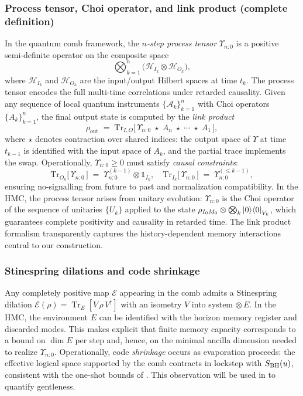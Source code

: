 \documentclass[a4paper,11pt]{article}
\newcommand{\HMC}{\textup{\textsc{HMC}}\xspace}
\theoremstyle{plain}
\theoremstyle{definition}
\theoremstyle{remark}
\begin{document}
\subsubsection{Process tensor, Choi operator, and link product (complete definition)}
\label{sssec:choi-link}
In the quantum comb framework, the \emph{$n$-step process tensor} $\Upsilon_{n{:}0}$ is a positive semi-definite operator on the composite space
\[
\bigotimes_{k=1}^n \bigl(\mathcal{H}_{I_k}\otimes\mathcal{H}_{O_k}\bigr),
\]
where $\mathcal{H}_{I_k}$ and $\mathcal{H}_{O_k}$ are the input/output Hilbert spaces at time $t_k$. The process tensor encodes the full multi-time correlations under retarded causality. Given any sequence of local quantum instruments $\{\mathcal{A}_k\}_{k=1}^n$ with Choi operators $\{A_k\}_{k=1}^n$, the final output state is computed by the \emph{link product}
\begin{equation}\label{eq:link-product}
\rho_{\mathrm{out}} \;=\; \mathrm{Tr}_{I,O}\!\Big[\,\Upsilon_{n{:}0} \;\star\; A_n \;\star\; \cdots \;\star\; A_1\,\Big],
\end{equation}
where $\star$ denotes contraction over shared indices: the output space of $\Upsilon$ at time $t_{k-1}$ is identified with the input space of $A_k$, and the partial trace implements the swap. Operationally, $\Upsilon_{n{:}0}\ge 0$ must satisfy \emph{causal constraints}:
\begin{equation}
\mathrm{Tr}_{O_k}\!\bigl[\,\Upsilon_{n{:}0}\,\bigr] \;=\; \Upsilon_{n{:}0}^{(k-1)}\otimes \mathbb{1}_{I_k},
\quad \mathrm{Tr}_{I_k}\!\bigl[\,\Upsilon_{n{:}0}\,\bigr] \;=\; \Upsilon_{n{:}0}^{(\le k-1)},
\end{equation}
ensuring no-signalling from future to past and normalization compatibility. In the \HMC{}, the process tensor arises from unitary evolution: $\Upsilon_{n{:}0}$ is the Choi operator of the sequence of unitaries $\{U_k\}$ applied to the state $\rho_{I_0M_0}\otimes\bigotimes_k\left|0\right\rangle\!\left\langle0\right|_{V_k}$, which guarantees complete positivity and causality in retarded time. The link product formalism transparently captures the history-dependent memory interactions central to our construction.


\subsubsection{Stinespring dilations and code shrinkage}
\label{sssec:dilation}
Any completely positive map $\mathcal{E}$ appearing in the comb admits a Stinespring dilation $\mathcal{E}(\rho)=\operatorname{Tr}_E[ V \, \rho \, V^\dagger ]$ with an isometry $V$ into system$\,\otimes E$. In the \HMC{}, the environment $E$ can be identified with the horizon memory register and discarded modes. This makes explicit that finite memory capacity corresponds to a bound on $\dim E$ per step and, hence, on the minimal ancilla dimension needed to realize $\Upsilon_{n{:}0}$. Operationally, code \emph{shrinkage} occurs as evaporation proceeds: the effective logical space supported by the comb contracts in lockstep with $S_{\rm BH}(u)$, consistent with the one-shot bounds of . This observation will be used in  to quantify gentleness.
\end{document}

